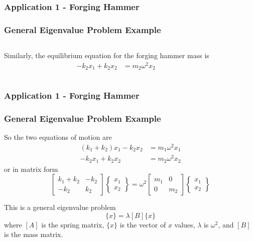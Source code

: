\documentclass[fleqn]{beamer} %
\newcommand{\sectionIIsubsectionIIItitle}{Application 1 - Forging Hammer}
\begin{document}
			\begin{frame}
				\frametitle{\sectionIIsubsectionIIItitle}\small
				\bigskip

				  \frametitle{General Eigenvalue Problem Example}
				  \begin{columns}
				    \begin{column}{0.7\textwidth}
				      Similarly, the equilibrium equation for the forging hammer mass
				      is
				      \begin{align*}
				        -k_2 x_1 + k_2 x_2 &= m_2 \omega^2 x_2
				      \end{align*}
				    \end{column}
				    \begin{column}{0.3\textwidth}
				    \end{column}
				  \end{columns}

				\btVFill 
			\end{frame}

			\begin{frame}
				\frametitle{\sectionIIsubsectionIIItitle}\small
				\bigskip

				  \frametitle{General Eigenvalue Problem Example}

				  So the two equations of motion are
				  \begin{align*}
				    (k_1 + k_2) x_1 - k_2 x_2 &= m_1 \omega^2 x_1 \\
				    -k_2 x_1 + k_2 x_2 &= m_2 \omega^2 x_2
				  \end{align*}
				  or in matrix form
				  \begin{displaymath}
				    \left[ \begin{array}{cc}
				        k_1 + k_2 & -k_2 \\
				        -k_2 & k_2
				      \end{array} \right]
				    \left\{ \begin{array}{c}
				        x_1 \\
				        x_2
				      \end{array} \right\} =
				    \omega^2
				    \left[ \begin{array}{cc}
				        m_1 & 0 \\
				        0 & m_2
				      \end{array} \right]
				    \left\{ \begin{array}{c}
				        x_1 \\
				        x_2
				    \end{array} \right\}
				  \end{displaymath}
				  
				  This is a general eigenvalue problem
				  \begin{displaymath}
				    [A]\{x\} = \lambda [B] \{x\}
				  \end{displaymath}
				  where $[A]$ is the spring matrix, $\{x\}$ is the vector of $x$
				  values, $\lambda$ is $\omega^2$, and $[B]$ is the mass matrix.

				\btVFill 
			\end{frame}
\end{document}
